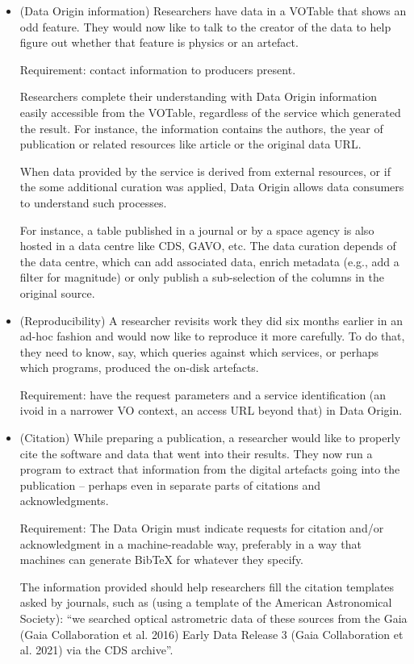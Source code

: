 \documentclass[11pt,a4paper]{ivoa}
\begin{document}
\begin{itemize}
	\item (Data Origin information) Researchers have data in a VOTable that shows an odd feature. They would now like to talk to the creator of the data to help figure out whether that feature is physics or an artefact.
	
	Requirement: contact information to producers present.
	
	Researchers complete their understanding with Data Origin information easily accessible from the VOTable, regardless of the service which generated the result. For instance, the information contains the authors, the year of publication or related resources like article or the original data URL.
		
	When data provided by the service is derived from external resources,
	or if the some additional curation was applied, Data Origin allows
	data consumers to understand such processes.
	
	For instance, a table published in a journal or by a space agency is also hosted in a data centre like CDS, GAVO, etc. The data curation depends of the data centre, which can add associated data, enrich metadata (e.g., add a filter for magnitude) or only publish a sub-selection of the columns in the original source.
	
	\item (Reproducibility) A researcher revisits work they did six months earlier in an ad-hoc fashion and would now like to reproduce it more carefully. To do that, they need to know, say, which queries against which services, or perhaps which programs, produced the on-disk artefacts.
	
	Requirement: have the request parameters and a service identification
	(an ivoid in a narrower VO context, an access URL beyond that)
	in Data Origin.
	
	\item (Citation) While preparing a publication, a researcher would like to properly cite the software and data that went into their results. They now run a program to extract that information from the digital artefacts going into the publication -- perhaps even in separate parts of citations and acknowledgments.
	
	Requirement: The Data Origin must indicate requests for citation and/or acknowledgment in a machine-readable way, preferably in a way that machines can generate BibTeX for whatever they specify.
	
	The information provided should help researchers fill the citation templates asked by journals, such as (using a template of the American Astronomical Society): ``we searched optical astrometric data of these sources from the Gaia (Gaia Collaboration et al. 2016) Early Data Release 3 (Gaia Collaboration et al. 2021) via the CDS archive''.
	

\end{itemize}
\end{document}
